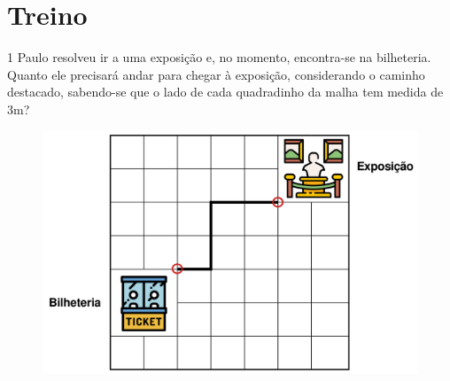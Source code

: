 \section*{Treino}

\num{1} Paulo resolveu ir a uma exposição e, no momento, encontra-se na
bilheteria. Quanto ele precisará andar para chegar à exposição,
considerando o caminho destacado, sabendo-se que o lado de cada
quadradinho da malha tem medida de 3m?

\begin{figure}[htpb!]
\includegraphics[width=\textwidth]{./media/image61.png}
\end{figure}

